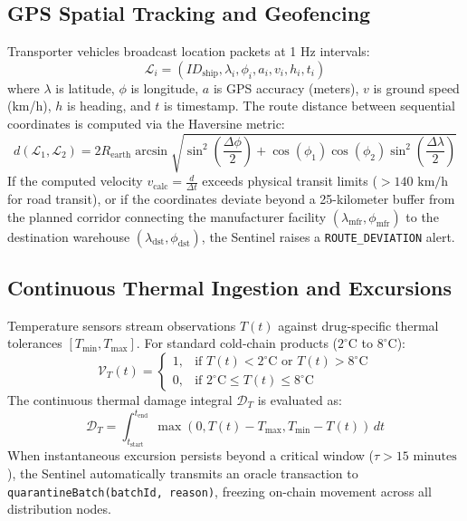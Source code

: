 \documentclass[pdflatex,sn-mathphys-num]{sn-jnl}
\theoremstyle{thmstyleone}
\theoremstyle{thmstyletwo}
\theoremstyle{thmstylethree}
\begin{document}
\subsection{GPS Spatial Tracking and Geofencing}

Transporter vehicles broadcast location packets at 1 Hz intervals:
\begin{equation}
\mathcal{L}_i = (ID_{\text{ship}}, \lambda_i, \phi_i, a_i, v_i, h_i, t_i)
\end{equation}
where $\lambda$ is latitude, $\phi$ is longitude, $a$ is GPS accuracy (meters), $v$ is ground speed (km/h), $h$ is heading, and $t$ is timestamp. The route distance between sequential coordinates is computed via the Haversine metric:
\begin{equation}
d(\mathcal{L}_1, \mathcal{L}_2) = 2R_{\text{earth}} \arcsin \sqrt{\sin^2\left(\frac{\Delta \phi}{2}\right) + \cos(\phi_1)\cos(\phi_2)\sin^2\left(\frac{\Delta \lambda}{2}\right)}
\end{equation}
If the computed velocity $v_{\text{calc}} = \frac{d}{\Delta t}$ exceeds physical transit limits ($> 140\text{ km/h}$ for road transit), or if the coordinates deviate beyond a 25-kilometer buffer from the planned corridor connecting the manufacturer facility $(\lambda_{\text{mfr}}, \phi_{\text{mfr}})$ to the destination warehouse $(\lambda_{\text{dst}}, \phi_{\text{dst}})$, the Sentinel raises a \texttt{ROUTE\_DEVIATION} alert.

\subsection{Continuous Thermal Ingestion and Excursions}

Temperature sensors stream observations $T(t)$ against drug-specific thermal tolerances $[T_{\min}, T_{\max}]$. For standard cold-chain products ($2^\circ\text{C}$ to $8^\circ\text{C}$):
\begin{equation}
\mathcal{V}_T(t) = \begin{cases}
1, & \text{if } T(t) < 2^\circ\text{C} \text{ or } T(t) > 8^\circ\text{C} \\
0, & \text{if } 2^\circ\text{C} \le T(t) \le 8^\circ\text{C}
\end{cases}
\end{equation}
The continuous thermal damage integral $\mathcal{D}_T$ is evaluated as:
\begin{equation}
\mathcal{D}_T = \int_{t_{\text{start}}}^{t_{\text{end}}} \max\left(0, T(t) - T_{\max}, T_{\min} - T(t)\right) \, dt
\end{equation}
When instantaneous excursion persists beyond a critical window ($\tau > 15\text{ minutes}$), the Sentinel automatically transmits an oracle transaction to \texttt{quarantineBatch(batchId, reason)}, freezing on-chain movement across all distribution nodes.
\end{document}
